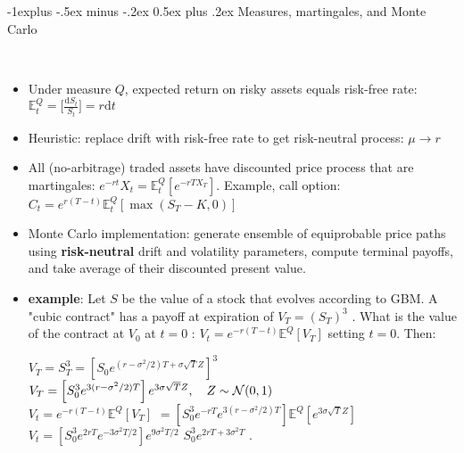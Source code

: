 \documentclass[10pt,landscape,a4paper]{article}
\makeatletter
\renewcommand{\subsection}{\@startsection{subsection}{2}{0mm}%
                                {-1explus -.5ex minus -.2ex}%
                                {0.5ex plus .2ex}%
                                {\normalfont\normalsize\bfseries}}
\makeatother
\begin{document}
\begin{multicols*}{3}
\begin{description}[topsep=0pt]
\begin{itemize}[topsep=0pt]
	\end{itemize}
\end{description}


\subsection{Measures, martingales, and Monte Carlo}

\begin{description}[topsep=0pt]
	\item[Risk-neutral pricing] ~
	\begin{itemize}[topsep=0pt]
		\item  Under measure $Q$, expected return on risky assets equals risk-free rate: $\mathbb{E}_t^Q=\big[ \frac{\text{d}S_t}{S_t}\big] = r \text{d}t$
		\item Heuristic: replace drift with risk-free rate to get risk-neutral process: $\mu \rightarrow r$
		\item All (no-arbitrage) traded assets have discounted price process that are
		martingales:  $e^{-rt}X_t = \mathbb{E}_t^Q[e^{-rT X_T}]$.  Example, call option: $C_t = e^{r(T-t)} \mathbb{E}_t^Q[\operatorname{max}(S_T-K,0)]$ 
		\item Monte Carlo implementation: generate ensemble of equiprobable price
		paths using \textbf{risk-neutral} drift and volatility parameters, compute terminal
		payoffs, and take average of their discounted present value.
		\item \textbf{example}: Let $S$  be the value of a stock that evolves according to GBM. A "cubic contract" has a payoff at expiration of $V_T=(S_T)^3$ . What is the value  of the contract at $V_0$ at $t=0$ :  $V_t = e^{-r(T-t)}\mathbb{E}^Q[V_T]$ setting $t=0$. Then: 
		
			
			$V_T = S_T^3 = \left[S_0 e^{(r-\sigma^2/2)T + \sigma{\sqrt T}Z}\right]^3$
			$V_T= \left[ S_0^3 e^{3(r-\sigma^2/2)T} \right] e^{3\sigma{\sqrt T}Z}, \quad Z \sim{\cal N}(0,1)$ \\
			$V_t = e^{-r(T-t)}\mathbb{E}^Q[V_T]$
			$= \left[ S_0^3 e^{-rT}e^{3(r-\sigma^2/2)T} \right] \mathbb{E}^Q\left[e^{ 3\sigma{\sqrt T}Z}\right]$ \\
			$V_t= \left[S_0^3 e^{2rT} e^{-3\sigma^2T/2} \right] e^{9\sigma^2 T/2}$ 
			$ S_0^3 e^{2rT+3\sigma^2T}$ .
	
	\end{itemize}
\end{description}



\end{multicols*}
\end{document}
